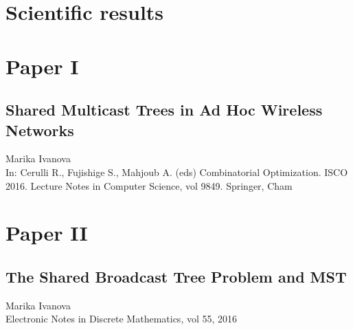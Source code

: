 \chapter{Scientific results}


\chapter*{Paper I}
\section{Shared Multicast Trees in Ad Hoc Wireless Networks}

\noindent Marika Ivanova\\

\noindent In: Cerulli R., Fujishige S., Mahjoub A. (eds) Combinatorial Optimization. ISCO 2016. Lecture Notes in Computer Science, vol 9849. Springer, Cham
\cleardoublepage


\chapter*{Paper II}
\section{The Shared Broadcast Tree Problem and MST}

\noindent Marika Ivanova\\

\noindent Electronic Notes in Discrete Mathematics, vol 55, 2016
\cleardoublepage

